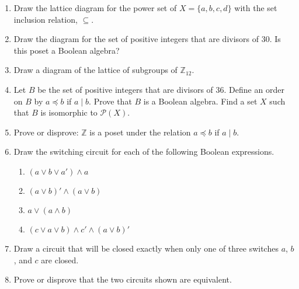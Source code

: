  
{\small
\begin{enumerate}
 
 
\item
Draw the lattice diagram for the power set of $X = \{ a, b, c, d \}$
with the set inclusion relation, $\subseteq$. 
 
 
\item
Draw the diagram for the set of positive integers that are divisors
of 30. Is this poset a Boolean algebra?
 
 
\item 
Draw a diagram of the lattice of subgroups of ${\mathbb Z}_{12}$.
 
 
\item
Let $B$ be the set of positive integers that are divisors of 36. Define
an order on $B$ by $a \preceq b$ if $a \mid b$.  Prove that $B$ is a
Boolean algebra. Find a set $X$ such that $B$ is isomorphic to ${\mathcal
P}(X)$.
 
 
\item
Prove or disprove: ${\mathbb Z}$ is a poset under the relation $a \preceq
b$ if $a \mid b$. 


\item
Draw the switching circuit for each of the following Boolean
expressions.
\begin{multicols}{2}
\begin{enumerate}

\item
$(a \vee b \vee a') \wedge a$

\item
$(a \vee b)' \wedge (a \vee b)$

\item
$a \vee (a \wedge b)$

\item
$(c \vee a \vee b) \wedge c' \wedge (a \vee b)'$

\end{enumerate}
\end{multicols}
  
 
\item
Draw a circuit that will be closed exactly when only one of three
switches $a$, $b$, and $c$ are closed.
 
 
\item
Prove or disprove that the two circuits shown are equivalent.

\begin{center}
\begin{tikzpicture}[scale=0.7,node distance=5mm, text height=1.5ex,text depth=.25ex] %



\end{tikzpicture}
\end{center}
\end{enumerate}}
